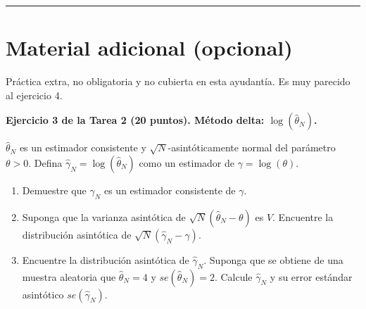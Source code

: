 \documentclass[letterpaper,11pt]{article}
\begin{document}
\vspace{2em}
\noindent\rule{\textwidth}{0.4pt}

\section*{Material adicional (opcional)}

\noindent Práctica extra, no obligatoria y no cubierta en esta ayudantía. Es muy parecido al
ejercicio 4.

\vspace{1em}

\noindent\textbf{Ejercicio 3 de la Tarea 2 (20 puntos). Método delta: $\log(\hat\theta_N)$.}

$\hat\theta_N$ es un estimador consistente y $\sqrt{N}$-asintóticamente normal del parámetro
$\theta>0$. Defina $\hat\gamma_N=\log(\hat\theta_N)$ como un estimador de $\gamma=\log(\theta)$.
\begin{enumerate}
    \item Demuestre que $\hat\gamma_N$ es un estimador consistente de $\gamma$.
    \item Suponga que la varianza asintótica de $\sqrt{N}(\hat\theta_N-\theta)$ es $V$.
    Encuentre la distribución asintótica de $\sqrt{N}(\hat\gamma_N-\gamma)$.
    \item Encuentre la distribución asintótica de $\hat\gamma_N$. Suponga que se obtiene de una
    muestra aleatoria que $\hat\theta_N=4$ y $se(\hat\theta_N)=2$. Calcule $\hat\gamma_N$ y su
    error estándar asintótico $se(\hat\gamma_N)$.
\end{enumerate}

\vspace{1em}
\end{document}
